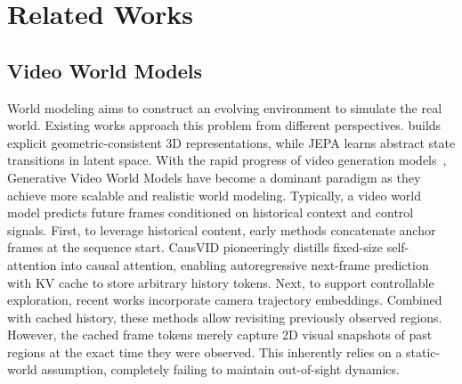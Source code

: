 \vspace{-2mm}
\section{Related Works}
\vspace{-1mm}
\subsection{Video World Models}
\label{sec:related_world_modeling}
World modeling aims to construct an evolving environment to simulate the real world. Existing works approach this problem from different perspectives. \cite{marble} builds explicit geometric-consistent 3D representations, while JEPA \cite{vjepa, vjepa2} learns abstract state transitions in latent space. With the rapid progress of video generation models~\cite{svd,animatediff,wan,hunyuanvideo}, Generative Video World Models \cite{genie1,genie3,waymo} have become a dominant paradigm as they achieve more scalable and realistic world modeling. Typically, a video world model predicts future frames conditioned on historical context and control signals. First, to leverage historical content, early methods \cite{svd,animatediff,wan,hunyuanvideo,history} concatenate anchor frames at the sequence start. CausVID \cite{CausVID} pioneeringly distills fixed-size self-attention into causal attention, enabling autoregressive next-frame prediction with KV cache \cite{selfforcing, selfforcing++,longlive,rollingforcing,deepforcing,blockvid, contextasmemory,genie1,genie3,liveavatar} to store arbitrary history tokens. Next, to support controllable exploration, recent works \cite{hunyuangamecraft,yan,pan,relic,matrixgame, cameractrl1,cameractrl2} incorporate camera trajectory embeddings. Combined with cached history, these methods allow revisiting previously observed regions. However, the cached frame tokens merely capture 2D visual snapshots of past regions at the exact time they were observed. This inherently relies on a static-world assumption, completely failing to maintain out-of-sight dynamics.

\vspace{-1.5mm}
